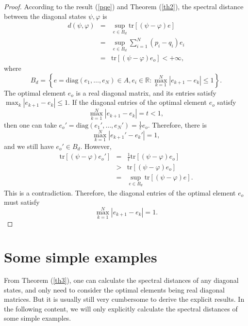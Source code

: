 \documentclass[a4paper,11pt]{article}
\begin{document}
\begin{proof}
  According to the result (\ref{pqe}) and Theorem (\ref{th2}), the spectral distance between the
  diagonal states $\psi, \varphi$ is
  \begin{eqnarray}
    d (\psi, \varphi) & = & \sup_{e \in B_d} \mathrm{tr} [(\psi - \varphi)
    e] \nonumber\\
    & = & \sup_{e \in B_d} \sum_{i = 1}^N (p_i - q_i) e_i 
    \nonumber\\
    & = & \mathrm{tr} [(\psi - \varphi) e_o]  < + \infty, 
  \end{eqnarray}
  where
  \begin{equation}
    B_d = \left\{ e = \mathrm{diag} (e_1, \ldots, e_N) \in A, e_i \in
    \mathbb{R}: \max_{k = 1}^N |e_{k + 1} - e_k | \leqslant 1 \right\} .
  \end{equation}
  The optimal element $e_o$ is a real diagonal matrix, and its entries satisfy
  $\max_{k} |e_{k + 1} - e_k | \leqslant 1$. If the diagonal entries of the optimal element $e_o$ satisfy
  \begin{equation}
    \max_{k = 1}^N |e_{k + 1} - e_k | = t < 1,
  \end{equation}
  then one can take $e_o' =\mathrm{diag} (e_1', \ldots, e_N')= \frac{1}{t} e_o$. Therefore, there is
  \begin{equation}
    \max_{k = 1}^N |e_{k + 1}' - e_k' | = 1,
  \end{equation}
  and we still have $e_o' \in B_d$. However,
  \begin{eqnarray}
    \mathrm{tr} [(\psi - \varphi) e_o'] & = & \frac{1}{t} 
    \mathrm{tr} [(\psi - \varphi) e_o] \nonumber\\
    & > & \mathrm{tr} [(\psi - \varphi) e_o] \nonumber\\
    & = & \sup_{e \in B_d} \mathrm{tr} [(\psi - \varphi) e] . 
  \end{eqnarray}
  This is a contradiction. Therefore, the diagonal entries of the optimal
  element $e_o$ must satisfy
  \begin{equation}
    \max_{k = 1}^N |e_{k + 1} - e_k | = 1.
  \end{equation}
\end{proof}



\section{Some simple examples}\label{sec4}
From Theorem (\ref{th3}), one can calculate the spectral distances
of any diagonal states, and only need to consider the optimal elements being real diagonal matrices.
But it is usually still very cumbersome to derive the explicit results.
In the following content, we will only explicitly calculate the spectral distances
of some simple examples.
\end{document}
